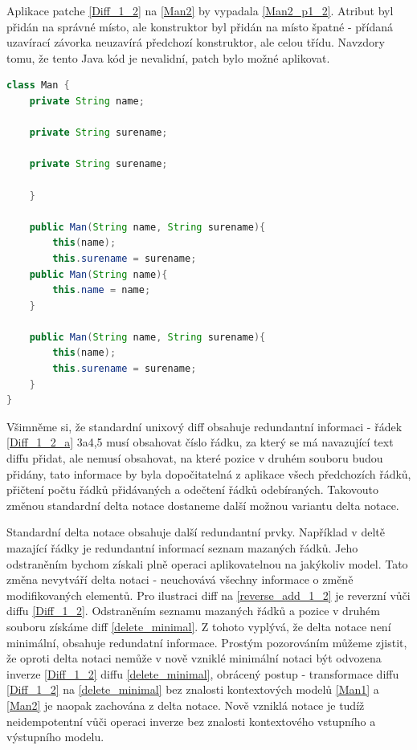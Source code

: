 \documentclass[11pt,twoside,a4paper]{book}
\begin{document}
Aplikace patche \ref{Diff_1_2} na \ref{Man2} by vypadala \ref{Man2_p1_2}.
Atribut byl přidán na správné místo, ale konstruktor byl přidán na místo špatné 
- přídaná uzavírací závorka neuzavírá předchozí konstruktor, ale celou třídu. 
Navzdory tomu, že tento Java kód je nevalidní, patch bylo možné aplikovat.\\

\begin{lstlisting}[language=JAVA,frame=single,caption=patch
aplikován na třídu Man2,label=Man2_p1_2]
class Man {
	private String name;

	private String surename;

	private String surename;

	}

	public Man(String name, String surename){
		this(name);
		this.surename = surename;
	public Man(String name){
		this.name = name;
	}

	public Man(String name, String surename){
		this(name);
		this.surename = surename;
	}
}
\end{lstlisting}

Všimněme si, že standardní unixový diff obsahuje redundantní informaci -
řádek \ref{Diff_1_2_a} 3a4,5 musí obsahovat číslo řádku, za který se má
navazující text diffu přidat, ale nemusí obsahovat, na které pozice v
druhém souboru budou přidány, tato informace by byla dopočitatelná z aplikace
všech předchozích řádků, přičtení počtu řádků přidávaných a odečtení řádků
odebíraných. Takovouto změnou standardní delta notace dostaneme další možnou
variantu delta notace.

Standardní delta notace obsahuje další redundantní prvky. Například v deltě
mazající řádky je redundantní informací seznam mazaných řádků. Jeho odstraněním
bychom získali plně operaci aplikovatelnou na jakýkoliv model. Tato změna
nevytváří delta notaci - neuchovává všechny informace o změně modifikovaných
elementů. Pro ilustraci diff na \ref{reverse_add_1_2} je reverzní vůči diffu
\ref{Diff_1_2}. Odstraněním seznamu mazaných řádků a pozice v druhém souboru
získáme diff \ref{delete_minimal}. Z tohoto vyplývá, že delta notace není
minimální, obsahuje redundatní informace. Prostým pozorováním můžeme zjistit,
že oproti delta notaci nemůže v nově vzniklé minimální notaci být odvozena
inverze \ref{Diff_1_2} diffu \ref{delete_minimal}, obrácený postup -
transformace diffu \ref{Diff_1_2} na \ref{delete_minimal} bez znalosti
kontextových modelů \ref{Man1} a \ref{Man2} je naopak zachována z delta notace.
Nově vzniklá notace je tudíž neidempotentní vůči operaci inverze bez znalosti
kontextového vstupního a výstupního modelu. 
\end{document}
